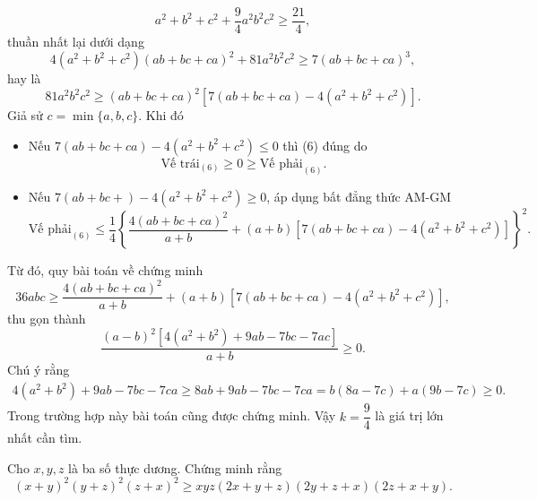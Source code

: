 {\begin{vd}
{		$$a^2+b^2+c^2+\dfrac{9}{4}a^2b^2c^2\ge \dfrac{21}{4},$$
		thuần nhất lại dưới dạng
		$$4(a^2+b^2+c^2)(ab+bc+ca)^2+81a^2b^2c^2\ge 7(ab+bc+ca)^3,$$
		hay là
		\[81a^2b^2c^2\ge (ab+bc+ca)^2\left[7(ab+bc+ca)-4(a^2+b^2+c^2) \right].\tag{6}\]
		Giả sử $c=\min\{a,b,c\}$. Khi đó
		\begin{itemize}
			\item Nếu $7(ab+bc+ca)-4(a^2+b^2+c^2)\le 0$ thì (6) đúng do
			$$\text{Vế trái}_{(6)}\ge 0\ge \text{Vế phải}_{(6)}.$$
			\item Nếu $7(ab+bc+)-4(a^2+b^2+c^2)\ge 0$, áp dụng bất đẳng thức AM-GM
			$$\text{Vế phải}_{(6)}\le \dfrac{1}{4} \left\{ \dfrac{4(ab+bc+ca)^2}{a+b}+(a+b)\left[ 7(ab+bc+ca)-4(a^2+b^2+c^2) \right] \right\}^2.$$
		\end{itemize}
		Từ đó, quy bài toán về chứng minh
		$$36abc\ge \dfrac{4(ab+bc+ca)^2}{a+b}+(a+b)\left[ 7(ab+bc+ca)-4(a^2+b^2+c^2)\right],$$
		thu gọn thành
		$$\dfrac{(a-b)^2\left[ 4(a^2+b^2)+9ab-7bc-7ac \right]}{a+b}\ge 0.$$
		Chú ý rằng 
		\begin{eqnarray*}
			4(a^2+b^2)+9ab-7bc-7ca\ge 8ab+9ab-7bc-7ca
			=b(8a-7c)+a(9b-7c)\ge 0.
		\end{eqnarray*}
		Trong trường hợp này bài toán cũng được chứng minh.
		Vậy $k=\dfrac{9}{4}$ là giá trị lớn nhất cần tìm.
	}
\end{vd}
\begin{vd}%
	Cho $x,y,z$ là ba số thực dương. Chứng minh rằng 
	\[(x+y)^2(y+z)^2(z+x)^2\geq xyz(2x+y+z)(2y+z+x)(2z+x+y). \tag{7}\]
\end{vd}

}
